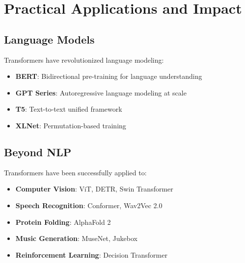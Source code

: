 
\section{Practical Applications and Impact}

\subsection{Language Models}

Transformers have revolutionized language modeling:

\begin{itemize}
    \item \textbf{BERT}: Bidirectional pre-training for language understanding
    \item \textbf{GPT Series}: Autoregressive language modeling at scale
    \item \textbf{T5}: Text-to-text unified framework
    \item \textbf{XLNet}: Permutation-based training
\end{itemize}

\subsection{Beyond NLP}

Transformers have been successfully applied to:
\begin{itemize}
    \item \textbf{Computer Vision}: ViT, DETR, Swin Transformer
    \item \textbf{Speech Recognition}: Conformer, Wav2Vec 2.0
    \item \textbf{Protein Folding}: AlphaFold 2
    \item \textbf{Music Generation}: MuseNet, Jukebox
    \item \textbf{Reinforcement Learning}: Decision Transformer
\end{itemize}
